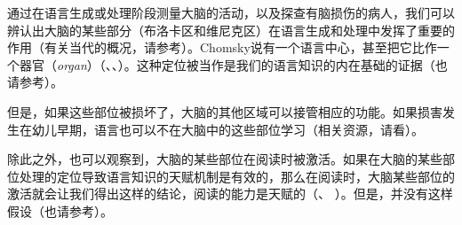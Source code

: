 通过在语言生成或处理阶段测量大脑的活动，以及探查有脑损伤的病人，我们可以辨认出大脑的某些部分（布洛卡区和维尼克区）在语言生成和处理中发挥了重要的作用（有关当代的概况，请参考）。Chomsky说有一个语言中心，甚至把它比作一个器官（\emph{organ}）（\citealp[]{Chomsky77c-u}、\citealp[]{Chomsky2005a}、\citealp[]{Chomsky2008a}）。这种定位被当作是我们的语言知识的内在基础的证据（也请参考\citealp[--314]{Pinker94a}）。

但是，如果这些部位被损坏了，大脑的其他区域可以接管相应的功能。如果损害发生在幼儿早期，语言也可以不在大脑中的这些部位学习（相关资源，请看\citealp[Section~4.1]{Dabrowska2004a}）。

除此之外，也可以观察到，大脑的某些部位在阅读时被激活。如果在大脑的某些部位处理的定位导致语言知识的天赋机制是有效的，那么在阅读时，大脑某些部位的激活就会让我们得出这样的结论，阅读的能力是天赋的（\citealp[\page ]{EBJKSPP96a}、
\citealp[]{Bishop2002a}）。但是，并没有这样假设（也请参考\citealp*[]{FHC2005a}）。

